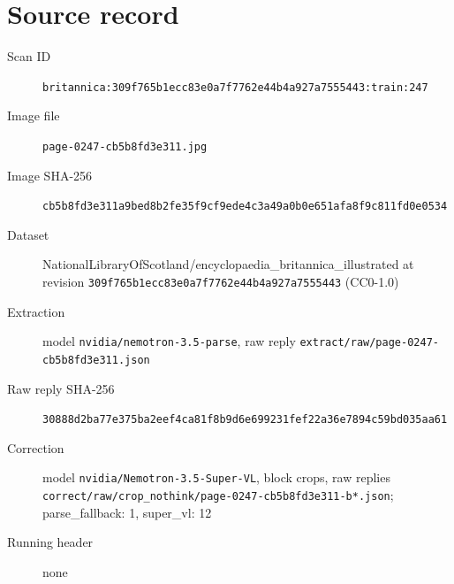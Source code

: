 \documentclass{article}
\begin{document}
\section*{Source record}
\begin{description}
\item[Scan ID] \texttt{britannica:309f765b1ecc83e0a7f7762e44b4a927a7555443:train:247}
\item[Image file] \texttt{page-0247-cb5b8fd3e311.jpg}
\item[Image SHA-256] \texttt{cb5b8fd3e311a9bed8b2fe35f9cf9ede4c3a49a0b0e651afa8f9c811fd0e0534}
\item[Dataset] NationalLibraryOfScotland/encyclopaedia\_britannica\_illustrated at revision \texttt{309f765b1ecc83e0a7f7762e44b4a927a7555443} (CC0-1.0)
\item[Extraction] model \texttt{nvidia/nemotron-3.5-parse}, raw reply \texttt{extract/raw/page-0247-cb5b8fd3e311.json}
\item[Raw reply SHA-256] \texttt{30888d2ba77e375ba2eef4ca81f8b9d6e699231fef22a36e7894c59bd035aa61}
\item[Correction] model \texttt{nvidia/Nemotron-3.5-Super-VL}, block crops, raw replies \texttt{correct/raw/crop\_nothink/page-0247-cb5b8fd3e311-b*.json}; parse\_fallback: 1, super\_vl: 12
\item[Running header] none
\end{description}
\end{document}
